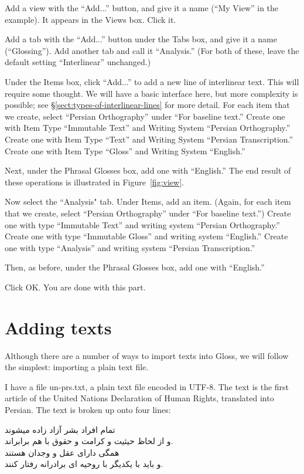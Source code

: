 \documentclass[oneside]{book}
\def\gloss{\textsf{Gloss}}
\def\sect#1{§\ref{#1}}
\def\fig#1{Figure~\ref{#1}}
\begin{document}
Add a view with the ``Add...'' button, and give it a name (``My View'' in the example). It appears in the Views box. Click it.

Add a tab with the ``Add...'' button under the Tabs box, and give it a name (``Glossing''). Add another tab and call it ``Analysis.'' (For both of these, leave the default setting ``Interlinear'' unchanged.)

Under the Items box, click ``Add...'' to add a new line of interlinear text. This will require some thought. We will have a basic interface here, but more complexity is possible; see \sect{sect:types-of-interlinear-lines} for more detail.  For each item that we create, select ``Persian Orthography'' under ``For baseline text.'' Create one with Item Type ``Immutable Text'' and Writing System ``Persian Orthography.'' Create one with Item Type ``Text'' and Writing System ``Persian Transcription.'' Create one with Item Type ``Gloss'' and Writing System ``English.''

Next, under the Phrasal Glosses box, add one with ``English.'' The end result of these operations is illustrated in \fig{fig:view}.

Now select the ``Analysis" tab. Under Items, add an item. (Again, for each item that we create, select ``Persian Orthography'' under ``For baseline text.'') Create one with type ``Immutable Text'' and writing system ``Persian Orthography.'' Create one with type ``Immutable Gloss'' and writing system ``English.'' Create one with type ``Analysis'' and writing system ``Persian Transcription.''

Then, as before, under the Phrasal Glosses box, add one with ``English.''

Click OK. You are done with this part.

\section{Adding texts}
Although there are a number of ways to import texts into \gloss, we will follow the simplest: importing a plain text file.

I have a file un-prs.txt, a plain text file encoded in UTF-8. The text is the first article of the United Nations Declaration of Human Rights, translated into Persian. The text is broken up onto four lines:

\medskip
\begin{farsi}
\noindent
تمام افراد بشر آزاد زاده میشوند \\
و از لحاظ حیثیت و کرامت و حقوق با هم برابراند.\\
همگی دارای عقل و وجدان هستند \\
و باید با یکدیگر با روحیه ای برادرانه رفتار کنند.
\end{farsi}
\end{document}
